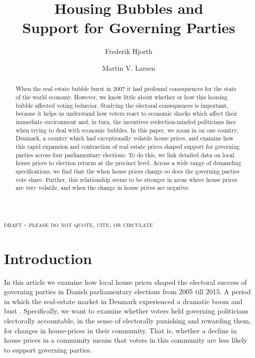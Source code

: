 \documentclass[12pt,a4paper]{article}
\title{\textbf{Housing Bubbles and \\Support for Governing Parties}}
\author{
Frederik Hjorth \and Martin V. Larsen}
\begin{document}
\maketitle

\begin{center}
\textsc{draft - please do not quote, cite, or circulate}
\end{center}

\begin{abstract}
\noindent When the real estate bubble burst in 2007 it had profound consequences for the state of the world economy. However, we know little about whether or how this housing bubble affected voting behavior. Studying the electoral consequences is important, because it helps us understand how voters react to economic shocks which affect their immediate environment and, in turn, the incentives reelection-minded politicians face when trying to deal with economic bubbles. In this paper, we zoom in on one country, Denmark, a country which had exceptionally volatile house prices, and examine how this rapid expansion and contraction of real estate prices shaped support for governing parties across four parliamentary elections. To do this, we link detailed data on local house prices to election returns at the precinct level. Across a wide range of demanding specifications, we find that the when house prices change so does the governing parties vote share. Further, this relationship seems to be stronger in areas where house prices are very volatile, and when the change in house prices are negative.
 
\end{abstract}



\newpage

\doublespacing

\section{Introduction}
In this article we examine how local house prices shaped the electoral success of governing parties in Danish parliamentary elections from 2005 till 2015. A period in which the real-estate market in Denmark experienced a dramatic boom and bust \citep{dam2011housing}. Specifically, we want to examine whether voters held governing politicians electorally accountable, in the sense of electorally punishing and rewarding them, for changes in house-prices in their community. That is, whether a decline in house prices in a community means that voters in this community are less likely to support governing parties. 
\end{document}
